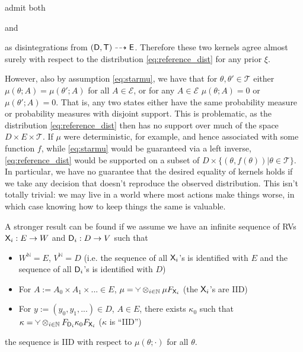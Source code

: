 admit both  and  as disintegrations from $(\mathsf{D},\mathsf{T})\dashrightarrow\mathsf{E}$. Therefore these two kernels agree almost surely with respect to the distribution \ref{eq:reference_dist} for any prior $\xi$. 

However, also by assumption \ref{eq:starmu}, we have that for $\theta,\theta'\in \mathscr{T}$  either $\mu(\theta;A)=\mu(\theta';A)$ for all $A\in \mathcal{E}$, or for any $A\in\mathcal{E}$ $\mu(\theta;A)=0$ or $\mu(\theta';A)=0$. That is, any two states either have the same probability measure or probability measures with disjoint support. This is problematic, as the distribution \ref{eq:reference_dist} then has no support over much of the space $D\times E\times \mathscr{T}$. If $\mu$ were deterministic, for example, and hence associated with some function $f$, while \ref{eq:starmu} would be guaranteed via a left inverse, \ref{eq:reference_dist} would be supported on a subset of $D\times\{(\theta,f(\theta))|\theta\in\mathscr{T}\}$. In particular, we have no guarantee that the desired equality of kernels holds if we take any decision that doesn't reproduce the observed distribution. This isn't totally trivial: we may live in a world where most actions make things worse, in which case knowing how to keep things the same is valuable.

A stronger result can be found if we assume we have an infinite sequence of RVs $\mathsf{X}_i:E\to W$ and $\mathsf{D}_i:D\to V$ such that
\begin{itemize}
	\item $W^\mathbb{N}=E$, $V^\mathbb{N}=D$ (i.e. the sequence of all $\mathsf{X}_i$'s is identified with $E$ and the sequence of all $\mathsf{D}_i$'s is identified with $D$)
 	\item For $A:=A_0\times A_1\times ... \in E$, $\mu = \splitter{0.1} \otimes_{i\in \mathbb{N}} \mu F_{\RV{X}_i}$ (the $\mathsf{X}_i$'s are IID)
 	\item For $y:=(y_0,y_1,...)\in D$, $A\in E$, there exists $\kappa_0$ such that $\kappa = \splitter{0.1}\otimes_{i\in\mathbb{N}} F_{\RV{D}_i} \kappa_0 F_{\RV{X}_i}$ ($\kappa$ is ``IID'')
 \end{itemize} the sequence is IID with respect to $\mu(\theta;\cdot)$ for all $\theta$.


